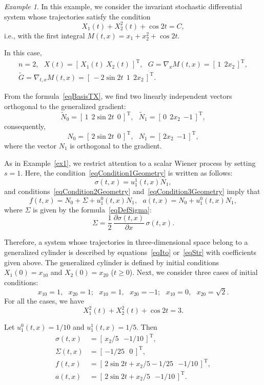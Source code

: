 \documentclass[10pt,reqno]{amsart}
\newcommand{\trans}{{\scriptscriptstyle \mathrm{T}}}
\theoremstyle{plain}
\theoremstyle{remark}
\newtheorem{Example}{Example}
\begin{document}
\begin{Example}\label{ex2}
In this example, we consider the invariant stochastic differential system whose trajectories satisfy the condition
\[
  X_1(t) + X_2^2(t) + \cos 2t = C,
\]
i.e., with the first integral $M(t,x) = x_1 + x_2^2 + \cos 2t$.

In this case,
\begin{gather*}
  n = 2, \ \ \ X(t) = [ \, X_1(t) ~ X_2(t) \, ]^\trans, \ \ \ G = \nabla_x M(t,x) = [ \, 1 \ \ 2x_2 \, ]^\trans, \\
  \tilde G = \nabla_{t,x} M(t,x) = [ \, -2\sin 2t \ \ 1 \ \ 2x_2 \, ]^\trans.
\end{gather*}

From the formula~\eqref{eqBasisTX}, we find two linearly independent vectors orthogonal to the generalized gradient:
\[
  \tilde N_0 = [ \, 1 \ \ 2\sin 2t \ \ 0 \, ]^\trans, \ \ \ \tilde N_1 = [ \, 0 \ \ 2x_2 \ \ {-1} \, ]^\trans,
\]
consequently,
\[
  N_0 = [ \, 2\sin 2t \ \ 0 \, ]^\trans, \ \ \ N_1 = [ \, 2x_2 \ \ {-1} \, ]^\trans,
\]
where the vector $N_1$ is orthogonal to the gradient.

As in Example~\ref{ex1}, we restrict attention to a scalar Wiener process by setting $s = 1$. Here, the condition~\eqref{eqCondition1Geometry} is written as follows:
\[
  \sigma(t,x) = u_1^1(t,x) N_1,
\]
and conditions~\eqref{eqCondition2Geometry} and~\eqref{eqCondition3Geometry} imply that
\[
  f(t,x) = N_0 + \Sigma + u_1^0(t,x) N_1, \ \ \ a(t,x) = N_0 + u_1^0(t,x) N_1,
\]
where $\Sigma$ is given by the formula~\eqref{eqDefSigma}:
\[
  \Sigma = \frac{1}{2} \, \frac{\partial \sigma(t,x)}{\partial x} \, \sigma(t,x).
\]

Therefore, a system whose trajectories in three-dimensional space belong to a generalized cylinder is described by equations~\eqref{eqIto} or~\eqref{eqStr} with coefficients given above. The generalized cylinder is defined by initial conditions $X_1(0) = x_{10}$ and $X_2(0) = x_{20}$ ($t \geqslant 0$). Next, we consider three cases of initial conditions:
\[
  x_{10} = 1, \ \ \ x_{20} = 1; \ \ \ x_{10} = 1, \ \ \ x_{20} = -1; \ \ \ x_{10} = 0, \ \ \ x_{20} = \sqrt{2}.
\]
For all the cases, we have
\[
  X_1^2(t) + X_2^2(t) + \cos 2t = 3.
\]

Let $u_1^0(t,x) = 1/10$ and $u_1^1(t,x) = 1/5$. Then
\begin{align*}
  \sigma(t,x) & = [ \, x_2/5 \ \ \ {-1/10} \, ]^\trans, \\
  \Sigma(t,x) & = [ \, {-1/25} \ \ \ 0 \, ]^\trans, \\
  f(t,x) & = [ \, 2\sin 2t + x_2/5 - 1/25 \ \ \ {-1/10} \, ]^\trans, \\
  a(t,x) & = [ \, 2\sin 2t + x_2/5 \ \ \ {-1/10} \, ]^\trans.
\end{align*}


\end{Example}
\end{document}
